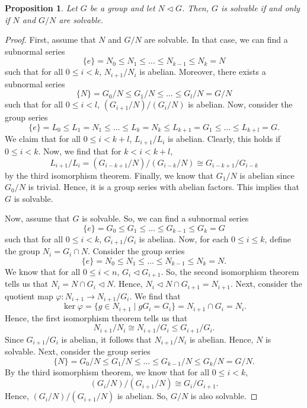 \documentclass[a4paper, openany]{memoir}
\theoremstyle{definition}
\theoremstyle{plain}
\newtheorem{proposition}[definition]{Proposition}
\begin{document}
    \begin{proposition}
        Let $G$ be a group and let $N \vartriangleleft G$. Then, $G$ is solvable if and only if $N$ and $G/N$ are solvable.
    \end{proposition}
    \begin{proof}
        First, assume that $N$ and $G/N$ are solvable. In that case, we can find a subnormal series
        \[\{e\} = N_0 \leq N_1 \leq \dots \leq N_{k-1} \leq N_k = N\]
        such that for all $0 \leq i < k$, $N_{i+1}/N_i$ is abelian. Moreover, there exists a subnormal series 
        \[\{N\} = G_0/N \leq G_1/N \leq \dots \leq G_l/N = G/N\]
        such that for all $0 \leq i < l$, $(G_{i+1}/N)/(G_i/N)$ is abelian. Now, consider the group series
        \[\{e\} = L_0 \leq L_1 = N_1 \leq \dots \leq L_k = N_k \leq L_{k+1} = G_1 \leq \dots \leq L_{k+l} = G.\]
        We claim that for all $0 \leq i < k+l$, $L_{i+1}/L_i$ is abelian. Clearly, this holds if $0 \leq i < k$. Now, we find that for $k < i < k+l$,
        \[L_{i+1}/L_i = (G_{i-k+1}/N)/(G_{i-k}/N) \cong G_{i-k+1}/G_{i-k}\]
        by the third isomorphism theorem. Finally, we know that $G_1/N$ is abelian since $G_0/N$ is trivial. Hence, it is a group series with abelian factors. This implies that $G$ is solvable.

        Now, assume that $G$ is solvable. So, we can find a subnormal series
        \[\{e\} = G_0 \leq G_1 \leq \dots \leq G_{k-1} \leq G_k = G\]
        such that for all $0 \leq i < k$, $G_{i+1}/G_i$ is abelian. Now, for each $0 \leq i \leq k$, define the group $N_i = G_i \cap N$. Consider the group series
        \[\{e\} = N_0 \leq N_1 \leq \dots \leq N_{k-1} \leq N_k = N.\]
        We know that for all $0 \leq i < n$, $G_i \vartriangleleft G_{i+1}$. So, the second isomorphism theorem tells us that $N_i = N \cap G_i \vartriangleleft N$. Hence, $N_i \vartriangleleft N \cap G_{i+1} = N_{i+1}$. Next, consider the quotient map $\varphi \colon N_{i+1} \to N_{i+1}/G_i$. We find that
        \[\ker \varphi = \{g \in N_{i+1} \mid gG_i = G_i\} = N_{i+1} \cap G_i = N_i.\]
        Hence, the first isomorphism theorem tells us that
        \[N_{i+1}/N_i \cong N_{i+1}/G_i \leq G_{i+1}/G_i.\]
        Since $G_{i+1}/G_i$ is abelian, it follows that $N_{i+1}/N_i$ is abelian. Hence, $N$ is solvable. Next, consider the group series
        \[\{N\} = G_0/N \leq G_1/N \leq \dots \leq G_{k-1}/N \leq G_k/N = G/N.\]
        By the third isomorphism theorem, we know that for all $0 \leq i < k$,
        \[(G_i/N)/(G_{i+1}/N) \cong G_i/G_{i+1}.\]
        Hence, $(G_i/N)/(G_{i+1}/N)$ is abelian. So, $G/N$ is also solvable.
    \end{proof}
\end{document}
